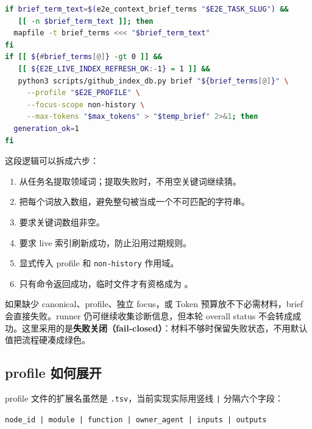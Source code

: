 \documentclass[UTF8,a4paper,zihao=-4,oneside]{ctexart}
\newcommand{\taskpath}[1]{\path{#1}}
\begin{document}
\noindent\begin{minipage}{\linewidth}
\begin{lstlisting}[language=bash,firstnumber=1426,
  caption={启动前生成 bounded brief 的真实控制条件},
  label={code:brief-generation}]
if brief_term_text=$(e2e_context_brief_terms "$E2E_TASK_SLUG") &&
   [[ -n $brief_term_text ]]; then
  mapfile -t brief_terms <<< "$brief_term_text"
fi
if [[ ${#brief_terms[@]} -gt 0 ]] &&
   [[ ${E2E_LIVE_INDEX_REFRESH_OK:-1} = 1 ]] &&
   python3 scripts/github_index_db.py brief "${brief_terms[@]}" \
     --profile "$E2E_PROFILE" \
     --focus-scope non-history \
     --max-tokens "$max_tokens" > "$temp_brief" 2>&1; then
  generation_ok=1
fi
\end{lstlisting}
\end{minipage}

这段逻辑可以拆成六步：

\begin{enumerate}
  \item 从任务名提取领域词；提取失败时，不用空关键词继续猜。
  \item 把每个词放入数组，避免整句被当成一个不可匹配的字符串。
  \item 要求关键词数组非空。
  \item 要求 live 索引刷新成功，防止沿用过期规则。
  \item 显式传入 profile 和 \texttt{non-history} 作用域。
  \item 只有命令返回成功，临时文件才有资格成为 \taskpath{context-brief.md}。
\end{enumerate}

如果缺少 canonical、profile、独立 focus，或 Token 预算放不下必需材料，brief 会直接失败。runner 仍可继续收集诊断信息，但本轮 overall status 不会转成成功。这里采用的是\textbf{失败关闭（fail-closed）}：材料不够时保留失败状态，不用默认值把流程硬凑成绿色。

\subsection{profile 如何展开}

profile 文件的扩展名虽然是 \texttt{.tsv}，当前实现实际用竖线 \texttt{|} 分隔六个字段：

\begin{center}
\texttt{node\_id | module | function | owner\_agent | inputs | outputs}
\end{center}
\end{document}
